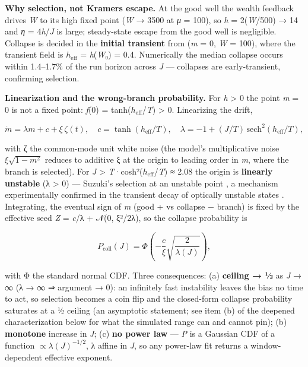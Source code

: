 \documentclass[11pt,letterpaper]{article}
\begin{document}
\textbf{Why selection, not Kramers escape.} At the good well the wealth feedback drives \emph{W} to its high fixed point (\emph{W} → 3500 at \emph{μ} = 100), so \emph{h} = 2(\emph{W}/500) → 14 and \emph{η} = 4\emph{h}/\emph{J} is large; steady-state escape from the good well is negligible. Collapse is decided in the \textbf{initial transient} from (\emph{m} = 0, \emph{W} = 100), where the transient field is \(h_{\mathrm{eff}}\) = \emph{h}(\emph{W}₀) = 0.4. Numerically the median collapse occurs within 1.4--1.7\% of the run horizon across \emph{J} --- collapses are early-transient, confirming selection.

\textbf{Linearization and the wrong-branch probability.} For \emph{h} \textgreater{} 0 the point \emph{m} = 0 is not a fixed point: \emph{f}(0) = tanh(\(h_{\mathrm{eff}}\)/\emph{T}) \textgreater{} 0. Linearizing the drift,

\[
\dot m = \lambda m + c + \xi\,\zeta(t), \quad c = \tanh(h_{\mathrm{eff}}/T), \quad \lambda = -1 + (J/T)\,\mathrm{sech}^2(h_{\mathrm{eff}}/T),
\]

with ζ the common-mode unit white noise (the model's multiplicative noise \(\xi \sqrt{1-m^2}\) reduces to additive ξ at the origin to leading order in \emph{m}, where the branch is selected). For \emph{J} \textgreater{} \emph{T}·cosh²(\(h_{\mathrm{eff}}\)/\emph{T}) ≈ 2.08 the origin is \textbf{linearly unstable} (λ \textgreater{} 0) --- Suzuki's selection at an unstable point \cite{suzuki1977,mckanetarlie2001}, a mechanism experimentally confirmed in the transient decay of optically unstable states \cite{arecchipoliti1980}. Integrating, the eventual sign of \emph{m} (good + vs collapse − branch) is fixed by the effective seed \emph{Z} = \emph{c}/λ + 𝒩(0, ξ²/2λ), so the collapse probability is

\[
P_{\mathrm{coll}}(J) = \Phi\!\left(-\frac{c}{\xi}\sqrt{\frac{2}{\lambda(J)}}\right),
\]

with Φ the standard normal CDF. Three consequences: (a) \textbf{ceiling → ½} as \emph{J} → ∞ (λ → ∞ ⇒ argument → 0): an infinitely fast instability leaves the bias no time to act, so selection becomes a coin flip and the closed-form collapse probability saturates at a ½ ceiling (an asymptotic statement; see item (b) of the deepened characterization below for what the simulated range can and cannot pin); (b) \textbf{monotone} increase in \emph{J}; (c) \textbf{no power law} --- \emph{P} is a Gaussian CDF of a function \(\propto \lambda(J)^{-1/2}\), λ affine in \emph{J}, so any power-law fit returns a window-dependent effective exponent.
\end{document}

